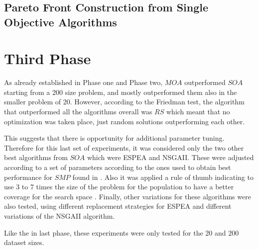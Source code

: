 \subsection{Pareto Front Construction from Single Objective Algorithms}


\section{Third Phase}

As already established in Phase one and Phase two, $MOA$ outperformed $SOA$ starting from a 200 size problem, and mostly outperformed them also in the smaller problem of 20. However, according to the Friedman test, the algorithm that outperformed all the algorithms overall was $RS$ which meant that no optimization was taken place, just random solutions outperforming each other.

This suggests that there is opportunity for additional parameter tuning. Therefore for this last set of experiments, it was considered only the two other best algorithms from $SOA$ which were ESPEA and NSGAII. These were adjusted according to a set of parameters according to the ones used to obtain best performance for $SMP$ found in \cite{}. Also it was applied a rule of thumb indicating to use 3 to 7 times the size of the problem for the population to have a better coverage for the search space \cite{}. Finally, other variations for these algorithms were also tested, using different replacement strategies for ESPEA and different variations of the NSGAII algorithm.

Like the in last phase, these experiments were only tested for the 20 and 200 dataset sizes.

